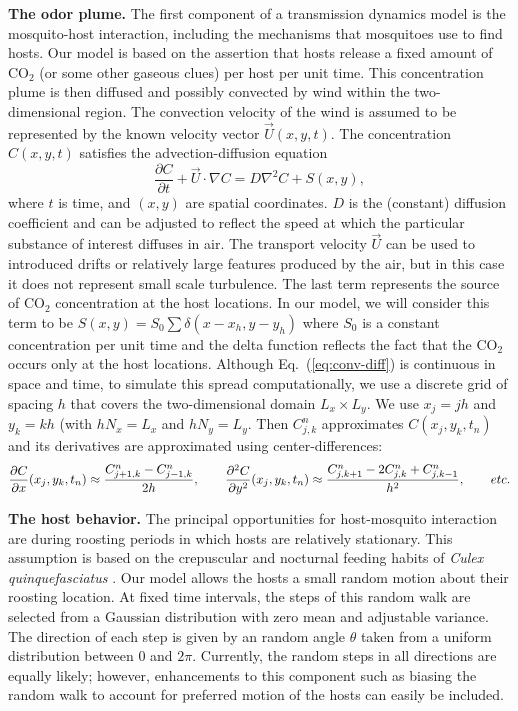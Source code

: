 \documentclass[11pt]{article}
\def\cq{{\emph{Culex quinquefasciatus} }}
\begin{document}
{\bf The odor plume.} The first component of a transmission dynamics model is the mosquito-host
interaction, including the mechanisms that mosquitoes use to find hosts.  Our model is based on
the assertion that hosts release a fixed amount of CO$_2$ (or some other gaseous clues) per host per
unit time.  This concentration plume is then diffused and possibly convected by wind within the
two-dimensional region. The convection velocity of the wind is assumed to be represented by
the known velocity vector ${\vec U}(x,y,t)$.  The concentration $C(x,y,t)$ satisfies the
advection-diffusion equation
\begin{equation}\label{eq:conv-diff}
\frac{\partial C}{\partial t} + {\vec U}\cdot\nabla C = D\nabla^2 C + S(x,y),
\end{equation}
where $t$ is time, and $(x,y)$ are spatial coordinates.  $D$ is the (constant) diffusion coefficient
and can be adjusted to reflect the speed at which the particular substance of interest diffuses in air.
The transport velocity ${\vec U}$ can be used to introduced drifts or relatively large features
produced by the air, but in this case it does not represent small scale turbulence.  The last term
represents the source of CO$_2$ concentration at the host locations. In our model, we will consider
this term to be $S(x,y) = S_0 \sum \delta(x-x_h,y-y_h)$ where $S_0$ is a constant concentration per
unit time and the delta function reflects the fact that the CO$_2$ occurs only at the host locations.
%
Although Eq.~(\ref{eq:conv-diff}) is continuous in space and time, to simulate this spread
computationally, we use a discrete grid of spacing $h$ that covers the two-dimensional
domain $L_x \times L_y$. We use $x_j = jh$ and $y_k = kh$ (with $h N_x = L_x$ and $h N_y = L_y$.
Then $C^n_{j,k}$ approximates $C(x_j,y_k,t_n)$ and its derivatives are approximated
using center-differences:
\[
\frac{\partial C}{\partial x}(x_j,y_k,t_n) \approx \frac{ C^n_{j+1,k} - C^n_{j-1,k} }{2h},
\hskip20pt
\frac{\partial^2 C}{\partial y^2}(x_j,y_k,t_n) \approx \frac{ C^n_{j,k+1} - 2C^n_{j,k} + C^n_{j,k-1} }{h^2},
\hskip20pt etc.
\]

{\bf The host behavior.} The principal opportunities for host-mosquito interaction are during roosting periods in which hosts are relatively stationary. This assumption is based on the crepuscular and nocturnal feeding habits of \cq. Our model allows the hosts a small random motion about their roosting location. At fixed time
intervals, the steps of this random walk are selected from a Gaussian distribution with zero mean and adjustable variance. The direction of each step is given by an random angle $\theta$ taken from a uniform distribution
between $0$ and $2\pi$.  Currently, the random steps in all directions are equally likely; however,
enhancements to this component such as biasing the random walk to account for preferred motion of the hosts can easily be included.
\end{document}
